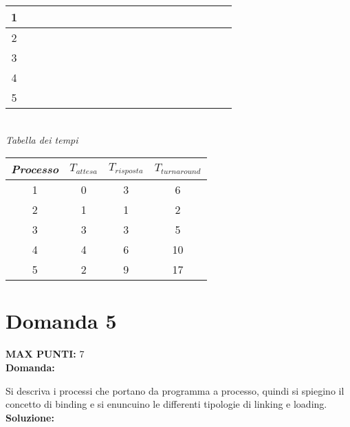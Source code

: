 \documentclass{article}
\begin{document}
\begin{itemize}
\begin{center}
\begin{tabular}{|c|c|c|c|c|c|c|c|c|c|c|c|c|c|c|c|c|c|c|c|}
                \hline
                1 & \cellcolor{red!25} & \cellcolor{red!25} & & & &  \cellcolor{red!25} & & &  & & & & & & & & &\\
                \hline
                2 & & & \cellcolor{red!25} & & & & & & & & & & & & & & & \\
                \hline
                3 & & & & & & & \cellcolor{red!25} & \cellcolor{red!25} & & & & & & & & & & \\
                \hline
                4 & & & & & & & & & \cellcolor{red!25} & \cellcolor{red!25} & & & \cellcolor{red!25} & \cellcolor{red!25} & & & & \\
                \hline
                5 & & & & \cellcolor{red!25} & \cellcolor{red!25} & & & & & & \cellcolor{red!25} & \cellcolor{red!25} & & & \cellcolor{red!25} & \cellcolor{red!25} & \cellcolor{red!25} & \cellcolor{red!25}\\
                \hline
            \end{tabular}\\
            \vspace{1cm}
            \emph{Tabella dei tempi}\\
            \begin{tabular}{|c|c|c|c|}
                \hline
                \emph{Processo} & $T_{attesa}$ & $T_{risposta}$ & $T_{turnaround}$\\
                \hline
                1 & 0 & 3 & 6\\
                \hline
                2 & 1 & 1 & 2\\
                \hline
                3 & 3 & 3 & 5\\
                \hline
                4 & 4 & 6 & 10\\
                \hline
                5 & 2 & 9 & 17\\
                \hline
            \end{tabular}
        \end{center}
    \end{itemize}
    \section*{Domanda 5}
    \textbf{MAX PUNTI:} 7\\
    \textbf{Domanda:}


    Si descriva i processi che portano da programma a processo, quindi si spiegino il concetto di binding e si enuncuino le differenti tipologie di linking e loading.\\
    \textbf{Soluzione:}
\end{document}
